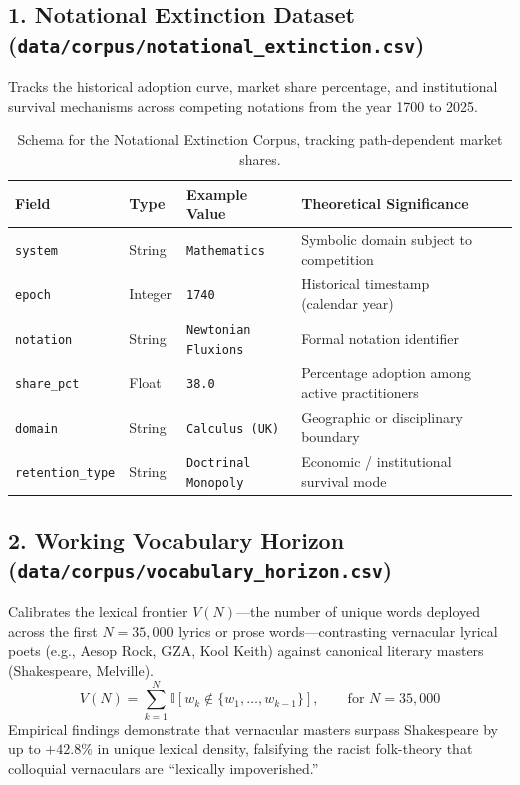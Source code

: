 \documentclass[11pt,letterpaper]{article}
\begin{document}
\subsection{1. Notational Extinction Dataset (\texttt{data/corpus/notational\_extinction.csv})}
Tracks the historical adoption curve, market share percentage, and institutional survival mechanisms across competing notations from the year 1700 to 2025.
\begin{table}[htbp]
\centering
\small
\begin{tabular}{@{}llllrl@{}}
\toprule
\textbf{Field} & \textbf{Type} & \textbf{Example Value} & \textbf{Theoretical Significance} \\
\midrule
\texttt{system} & String & \texttt{Mathematics} & Symbolic domain subject to competition \\
\texttt{epoch} & Integer & \texttt{1740} & Historical timestamp (calendar year) \\
\texttt{notation} & String & \texttt{Newtonian Fluxions} & Formal notation identifier \\
\texttt{share\_pct} & Float & \texttt{38.0} & Percentage adoption among active practitioners \\
\texttt{domain} & String & \texttt{Calculus (UK)} & Geographic or disciplinary boundary \\
\texttt{retention\_type} & String & \texttt{Doctrinal Monopoly} & Economic / institutional survival mode \\
\bottomrule
\end{tabular}
\caption{Schema for the Notational Extinction Corpus, tracking path-dependent market shares.}
\label{tab:schema_extinction}
\end{table}

\subsection{2. Working Vocabulary Horizon (\texttt{data/corpus/vocabulary\_horizon.csv})}
Calibrates the lexical frontier $V(N)$---the number of unique words deployed across the first $N = 35{,}000$ lyrics or prose words---contrasting vernacular lyrical poets (e.g., Aesop Rock, GZA, Kool Keith) against canonical literary masters (Shakespeare, Melville).
\begin{equation}
V(N) = \sum_{k=1}^N \mathbb{I}[w_k \notin \{w_1, \dots, w_{k-1}\}], \qquad \text{for } N = 35{,}000
\end{equation}
Empirical findings demonstrate that vernacular masters surpass Shakespeare by up to $+42.8\%$ in unique lexical density, falsifying the racist folk-theory that colloquial vernaculars are ``lexically impoverished.''
\end{document}
